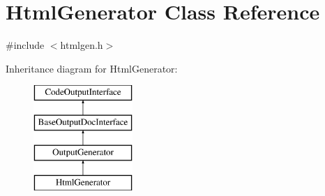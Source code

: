 \hypertarget{class_html_generator}{}\section{Html\+Generator Class Reference}
\label{class_html_generator}


{\ttfamily \#include $<$htmlgen.\+h$>$}

Inheritance diagram for Html\+Generator\+:\begin{figure}[H]
\begin{center}
\leavevmode
\includegraphics[height=4.000000cm]{class_html_generator}
\end{center}
\end{figure}
